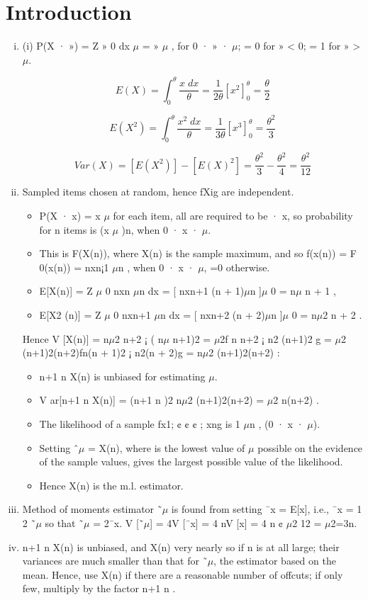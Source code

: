 \documentclass[a4paper,12pt]{article}
\begin{document}
\section{Introduction}
\begin{enumerate}[(i)]
\item (i) P(X · ») =
Z »
0
dx
$\mu$
= »
$\mu$
, for 0 · » · $\mu$; = 0 for » < 0; = 1 for » > $\mu$.

\[E(X) = \int^{\theta}_{0} \frac{x\;dx}{\theta} = \frac{1}{2\theta}\left[ x^2 \right]^{\theta}_{0} = \frac{\theta}{2}\]



\[E(X^2) = \int^{\theta}_{0} \frac{x^2\;dx}{\theta} = \frac{1}{3\theta}\left[ x^3 \right]^{\theta}_{0} = \frac{\theta^2}{3}\]

\[ Var(X) = [E(X^2)] - [E(X)^2] = \frac{\theta^2}{3} - \frac{\theta^2}{4} = \frac{\theta^2}{12}\]
\item Sampled items chosen at random, hence fXig are independent. 
\begin{itemize}
\item P(X · x) =
x
$\mu$ for each item, all are required to be · x, so probability for n items is (x
$\mu$ )n,
when 0 · x · $\mu$. 
\item This is F(X(n)), where X(n) is the sample maximum, and
so f(x(n)) = F
0(x(n)) = nxn¡1
$\mu$n , when 0 · x · $\mu$, =0 otherwise.
\item E[X(n)] =
Z $\mu$
0
nxn
$\mu$n dx = [ nxn+1
(n + 1)$\mu$n ]$\mu$
0 = n$\mu$
n + 1
,
\item E[X2
(n)] =
Z $\mu$
0
nxn+1
$\mu$n dx = [ nxn+2
(n + 2)$\mu$n ]$\mu$
0 = n$\mu$2
n + 2
.

\end{itemize}
Hence
V [X(n)] = n$\mu$2
n+2 ¡ ( n$\mu$
n+1)2 = $\mu$2f n
n+2 ¡ n2
(n+1)2 g
= $\mu$2
(n+1)2(n+2)fn(n + 1)2 ¡ n2(n + 2)g = n$\mu$2
(n+1)2(n+2) :
\begin{itemize}
\item n+1
n X(n) is unbiased for estimating $\mu$.
\item V ar[n+1
n X(n)] = (n+1
n )2 n$\mu$2
(n+1)2(n+2) = $\mu$2
n(n+2) .
\item The likelihood of a sample fx1; ¢ ¢ ¢ ; xng is 1
$\mu$n , (0 · x · $\mu$).
\item Setting ˆ$\mu$ = X(n), where is the lowest value of $\mu$ possible on the evidence of
the sample values, gives the largest possible value of the likelihood.
\item  Hence X(n) is the m.l. estimator.
\end{itemize}
\item Method of moments estimator ˜$\mu$ is found from setting ¯x = E[x], i.e., ¯x = 1
2
˜$\mu$
so that ˜$\mu$ = 2¯x. V [˜$\mu$] = 4V [¯x] = 4
nV [x] = 4
n ¢ $\mu$2
12 = $\mu$2=3n.
\item n+1
n X(n) is unbiased, and X(n) very nearly so if n is at all large; their
variances are much smaller than that for ˜$\mu$, the estimator based on the mean.
Hence, use X(n) if there are a reasonable number of offcuts; if only few,
multiply by the factor n+1
n .
\end{enumerate}
\end{document}

